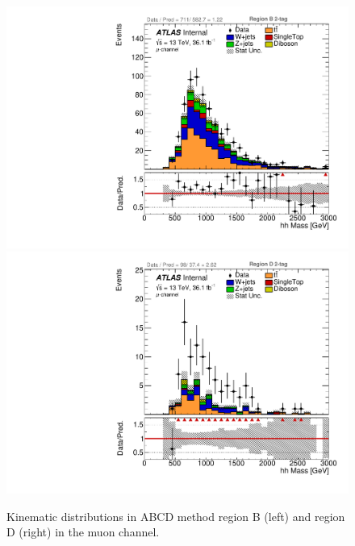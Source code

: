 \begin{figure}[!htbp]
\begin{center}
\includegraphics[scale=0.23]{./figures/boosted/ABCD/muon_Inc_RegionB_hhMass}
\includegraphics[scale=0.23]{./figures/boosted/ABCD/muon_Inc_RegionD_hhMass}
\caption{Kinematic distributions in ABCD method region B (left) and region D (right) in the muon channel.}
\label{fig:boosted_abcd_region_bd_muon}
\end{center}
\end{figure}


